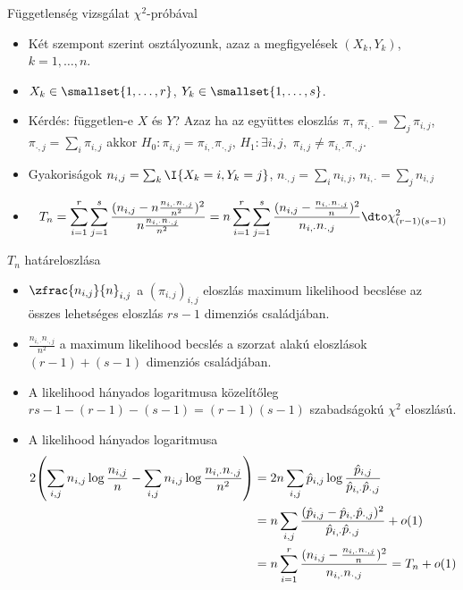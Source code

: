 \documentclass[aspectratio=169,notheorems,9pt,\option]{beamer}
\begin{document}
\begin{frame}{Függetlenség vizsgálat $\chi^2$-próbával}
  \begin{itemize}
    \item Két szempont szerint osztályozunk, azaz a megfigyelések
    $(X_k,Y_k)$, $k=1,\dots,n$.
    \item $X_k\in\smallset{1,\dots,r}$, $Y_k\in\smallset{1,\dots,s}$.
    
    \item Kérdés: független-e $X$ és $Y$? Azaz ha az együttes eloszlás
    $\pi$, $\pi_{i,\cdot}=\sum_j \pi_{i,j}$, $\pi_{\cdot,j}=\sum_i
    \pi_{i,j}$ akkor $H_0:\pi_{i,j}=\pi_{i,\cdot}\pi_{\cdot,j}$,
    $H_1:\exists i,j,\,\,\pi_{i,j}\neq\pi_{i,\cdot}\pi_{\cdot,j}$.
    
    \item Gyakoriságok $n_{i,j}=\sum_{k}\I{X_k=i,Y_k=j}$,
    $n_{\cdot,j}=\sum_{i}n_{i,j}$, $n_{i,\cdot}=\sum_j n_{i,j}$
    \item 
    \begin{displaymath}
      T_n=\sum_{i=1}^r\sum_{j=1}^s
      \frac{(n_{i,j}-n\frac{n_{i,\cdot}n_{\cdot,j}}{n^2})^2}{n\frac{n_{i,\cdot}n_{\cdot,j}}{n^2}}
      =n
      \sum_{i=1}^r\sum_{j=1}^s
      \frac{(n_{i,j}-\frac{n_{i,\cdot}n_{\cdot,j}}{n})^2}{n_{i,\cdot}n_{\cdot,j}}
      \dto\chi^2_{(r-1) (s-1)}
    \end{displaymath}
    
  \end{itemize}
\end{frame}

\begin{frame}{$T_n$ határeloszlása}
  \begin{itemize}
    \item $\zfrac{n_{i,j}}{n}_{i,j}$ a $(\pi_{i,j})_{i,j}$ eloszlás
    maximum likelihood becslése az összes lehetséges eloszlás
    $rs-1$ dimenziós családjában.
    \item $\frac{n_{i,\cdot}n_{\cdot,j}}{n^2}$ a maximum likelihood
    becslés a szorzat alakú eloszlások $(r-1)+(s-1)$ dimenziós
    családjában. 
    \item A likelihood hányados logaritmusa közelítőleg $rs-1- (r-1) - (s-1)= (r-1)
    (s-1)$ szabadságokú $\chi^2$ eloszlású.
    \item A likelihood hányados logaritmusa
    \begin{align*}
      2\zjel*{\sum_{i,j}n_{i,j}\log\frac{n_{i,j}}n-\sum_{i,j}n_{i,j}\log\frac{n_{i,\cdot}n_{\cdot,j}}{n^2}}
      &=
      2n\sum_{i,j}\hat p_{i,j}\log\frac{\hat p_{i,j}}{\hat p_{i,\cdot}\hat p_{\cdot,j}}\\
      &=n\sum_{i,j}\frac{(\hat p_{i,j}-\hat p_{i,\cdot}\hat
      p_{\cdot,j})^2}{\hat p_{i,\cdot}\hat p_{\cdot,j}}+o (1)
      \\
      &=
      n\sum_{i=1}^r\frac{(n_{i,j}-\frac{n_{i,\cdot}n_{\cdot,j}}{n})^2}{n_{i,\cdot}n_{\cdot,j}}=T_n+o (1)
    \end{align*}
  \end{itemize}
  
\end{frame}
\end{document}

